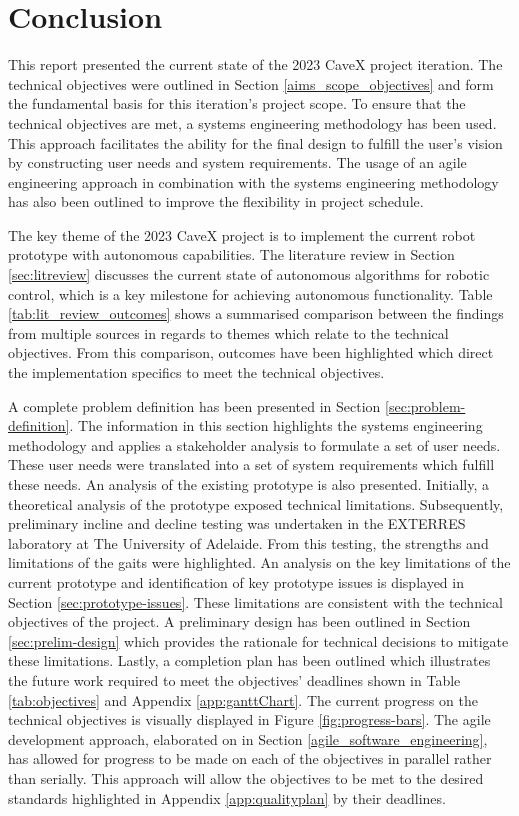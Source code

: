 \section{Conclusion}
This report presented the current state of the 2023 CaveX project iteration. The technical objectives were outlined in Section \ref{aims_scope_objectives} and form the fundamental basis for this iteration's project scope. To ensure that the technical objectives are met, a systems engineering methodology has been used. This approach facilitates the ability for the final design to fulfill the user's vision by constructing user needs and system requirements. The usage of an agile engineering approach in combination with the systems engineering methodology has also been outlined to improve the flexibility in project schedule.

The key theme of the 2023 CaveX project is to implement the current robot prototype with autonomous capabilities. The literature review in Section \ref{sec:litreview} discusses the current state of autonomous algorithms for robotic control, which is a key milestone for achieving autonomous functionality. Table \ref{tab:lit_review_outcomes} shows a summarised comparison between the findings from multiple sources in regards to themes which relate to the technical objectives. From this comparison, outcomes have been highlighted which direct the implementation specifics to meet the technical objectives.

A complete problem definition has been presented in Section \ref{sec:problem-definition}. The information in this section highlights the systems engineering methodology and applies a stakeholder analysis to formulate a set of user needs. These user needs were translated into a set of system requirements which fulfill these needs. An analysis of the existing prototype is also presented. Initially, a theoretical analysis of the prototype exposed technical limitations. Subsequently, preliminary incline and decline testing was undertaken in the EXTERRES laboratory at The University of Adelaide. From this testing, the strengths and limitations of the gaits were highlighted. An analysis on the key limitations of the current prototype and identification of key prototype issues is displayed in Section \ref{sec:prototype-issues}. These limitations are consistent with the technical objectives of the project. A preliminary design has been outlined in Section \ref{sec:prelim-design} which provides the rationale for technical decisions to mitigate these limitations. Lastly, a completion plan has been outlined which illustrates the future work required to meet the objectives' deadlines shown in Table \ref{tab:objectives} and Appendix \ref{app:ganttChart}. The current progress on the technical objectives is visually displayed in Figure \ref{fig:progress-bars}. The agile development approach, elaborated on in Section \ref{agile_software_engineering}, has allowed for progress to be made on each of the objectives in parallel rather than serially. This approach will allow the objectives to be met to the desired standards highlighted in Appendix \ref{app:qualityplan} by their deadlines.